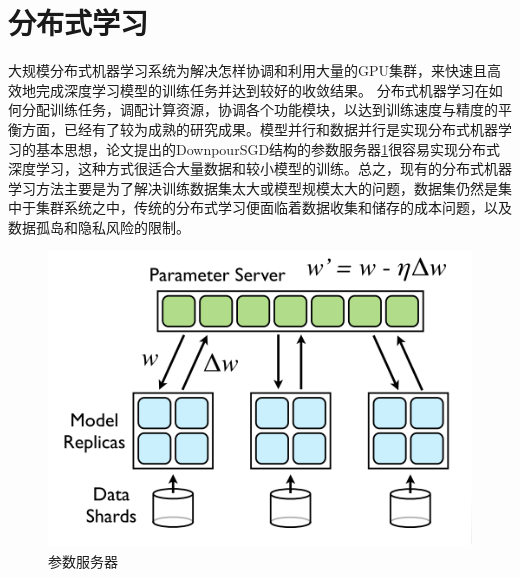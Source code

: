 \documentclass[zihao = -4,cn]{oucart}
\begin{document}
\section{分布式学习}
大规模分布式机器学习系统为解决怎样协调和利用大量的GPU集群，来快速且高效地完成深度学习模型的训练任务并达到较好的收敛结果。 分布式机器学习在如何分配训练任务，调配计算资源，协调各个功能模块，以达到训练速度与精度的平衡方面，已经有了较为成熟的研究成果\cite{ho2013more}\cite{xing2015petuum}\cite{wei2015managed}。模型并行和数据并行是实现分布式机器学习的基本思想，论文\cite{dean2012large}提出的DownpourSGD结构的参数服务器\ref{fig:pserver}很容易实现分布式深度学习，这种方式很适合大量数据和较小模型的训练。总之，现有的分布式机器学习方法主要是为了解决训练数据集太大或模型规模太大的问题，数据集仍然是集中于集群系统之中，传统的分布式学习便面临着数据收集和储存的成本问题，以及数据孤岛和隐私风险的限制。

\begin{figure}[h]
	\centering %
	\includegraphics[scale=0.5]{assets/pserver}
	\caption{参数服务器\cite{dean2012large}}
	\label{fig:pserver}
\end{figure}
\end{document}
